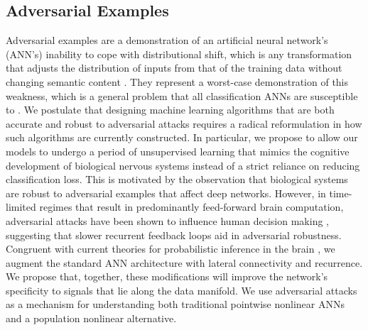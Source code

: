 \subsection{Adversarial Examples}
Adversarial examples are a demonstration of an artificial neural network's (ANN’s) inability to cope with distributional shift, which is any transformation that adjusts the distribution of inputs from that of the training data without changing semantic content \parencite{ford2019adversarial}.
They represent a worst-case demonstration of this weakness, which is a general problem that all classification ANNs are susceptible to \parencite{hendrycks2018benchmarking}.
We postulate that designing machine learning algorithms that are both accurate and robust to adversarial attacks requires a radical reformulation in how such algorithms are currently constructed.
In particular, we propose to allow our models to undergo a period of unsupervised learning that mimics the cognitive development of biological nervous systems instead of a strict reliance on reducing classification loss.
This is motivated by the observation that biological systems are robust to adversarial examples that affect deep networks.
However, in time-limited regimes that result in predominantly feed-forward brain computation, adversarial attacks have been shown to influence human decision making \parencite{elsayed2018adversarial}, suggesting that slower recurrent feedback loops aid in adversarial robustness.
Congruent with current theories for probabilistic inference in the brain \parencite{lee2003hierarchical}, we augment the standard ANN architecture with lateral connectivity and recurrence.
We propose that, together, these modifications will improve the network’s specificity to signals that lie along the data manifold.
We use adversarial attacks as a mechanism for understanding both traditional pointwise nonlinear ANNs and a population nonlinear alternative.

